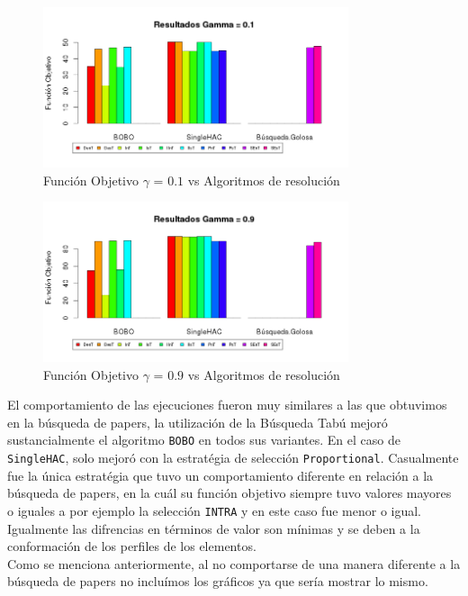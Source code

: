 \begin{figure}[H]
  \centering
    \includegraphics[width=0.8\textwidth]{resultados/authors/Graficos_agrupados/gamma01-autores.png}
  \caption{Función Objetivo $\gamma$ = $0.1$ vs Algoritmos de resolución}
  \label{res:img-autores-agr-gamma01}
\end{figure}

\begin{figure}[H]
  \centering
    \includegraphics[width=0.8\textwidth]{resultados/authors/Graficos_agrupados/gamma09-autores.png}
  \caption{Función Objetivo $\gamma$ = $0.9$ vs Algoritmos de resolución}
  \label{res:img-autores-agr-gamma09}
\end{figure}

El comportamiento de las ejecuciones fueron muy similares a las que obtuvimos en la búsqueda de papers, la utilización de la Búsqueda Tabú mejoró sustancialmente el algoritmo \texttt{BOBO} en todos sus variantes. En el caso de \texttt{SingleHAC}, solo mejoró con la estratégia de selección \texttt{Proportional}. Casualmente fue la única estratégia que tuvo un comportamiento diferente en relación a la búsqueda de papers, en la cuál su función objetivo siempre tuvo valores mayores o iguales a por ejemplo la selección \texttt{INTRA} y en este caso fue menor o igual. Igualmente las difrencias en términos de valor son mínimas y se deben a la conformación de los perfiles de los elementos.\\
Como se menciona anteriormente, al no comportarse de una manera diferente a la búsqueda de papers no incluímos los gráficos ya que sería mostrar lo mismo.
\newpage
